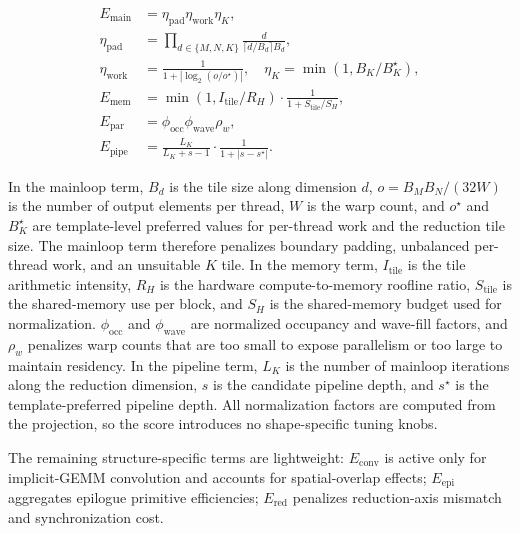 \[
\begin{aligned}
E_{\mathrm{main}} &=
\eta_{\mathrm{pad}}\eta_{\mathrm{work}}\eta_K,\\
\eta_{\mathrm{pad}} &=
\prod_{d\in\{M,N,K\}}
\frac{d}{\lceil d/B_d\rceil B_d},\\
\eta_{\mathrm{work}} &=
\frac{1}{1+|\log_2(o/o^\star)|}, \quad
\eta_K=\min(1,B_K/B_K^\star),\\
E_{\mathrm{mem}} &=
\min(1,I_{\mathrm{tile}}/R_H)
\cdot \frac{1}{1+S_{\mathrm{tile}}/S_H},\\
E_{\mathrm{par}} &=
\phi_{\mathrm{occ}}\phi_{\mathrm{wave}}\rho_w,\\
E_{\mathrm{pipe}} &=
\frac{L_K}{L_K+s-1}
\cdot \frac{1}{1+|s-s^\star|}.
\end{aligned}
\]

In the mainloop term, $B_d$ is the tile size along dimension $d$, $o=B_MB_N/(32W)$ is the
number of output elements per thread, $W$ is the warp count, and $o^\star$ and
$B_K^\star$ are template-level preferred values for per-thread work and the
reduction tile size.  The mainloop term therefore penalizes boundary padding,
unbalanced per-thread work, and an unsuitable $K$ tile.  In the memory term,
$I_{\mathrm{tile}}$ is the tile arithmetic intensity, $R_H$ is the hardware
compute-to-memory roofline ratio, $S_{\mathrm{tile}}$ is the shared-memory use
per block, and $S_H$ is the shared-memory budget used for normalization. 
$\phi_{\mathrm{occ}}$ and $\phi_{\mathrm{wave}}$ are normalized occupancy and
wave-fill factors, and $\rho_w$ penalizes warp counts that are too small to
expose parallelism or too large to maintain residency.  In the pipeline term, $L_K$ is the
number of mainloop iterations along the reduction dimension, $s$ is the
candidate pipeline depth, and $s^\star$ is the template-preferred pipeline
depth.  All normalization factors are computed from the projection, so the
score introduces no shape-specific tuning knobs.

The remaining structure-specific terms are lightweight:
$E_{\mathrm{conv}}$ is active only for implicit-GEMM convolution and accounts for
spatial-overlap effects; $E_{\mathrm{epi}}$ aggregates
epilogue primitive efficiencies; $E_{\mathrm{red}}$ penalizes reduction-axis
mismatch and synchronization cost.


